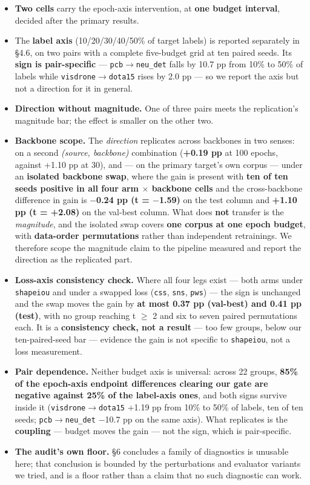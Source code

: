 \documentclass[pdflatex,sn-mathphys-ay]{sn-jnl}
\begin{document}
\begin{itemize}
\item \textbf{Two cells} carry the epoch-axis intervention, at \textbf{one budget interval}, decided after the primary results.
\item The \textbf{label axis} (10/20/30/40/50\% of target labels) is reported separately in \S{}4.6, on two pairs with a complete five-budget grid at ten paired seeds. Its \textbf{sign is pair-specific} --- \texttt{pcb\ensuremath{\rightarrow}neu\_det} falls by 10.7 pp from 10\% to 50\% of labels while \texttt{visdrone\ensuremath{\rightarrow}dota15} rises by 2.0 pp --- so we report the axis but not a direction for it in general.
\item \textbf{Direction without magnitude.} One of three pairs meets the replication's magnitude bar; the effect is smaller on the other two.
\item \textbf{Backbone scope.} The \emph{direction} replicates across backbones in two senses: on a second \emph{(source, backbone)} combination (\textbf{+0.19 pp} at 100 epochs, against +1.10 pp at 30), and --- on the primary target's own corpus --- under an \textbf{isolated backbone swap}, where the gain is present with \textbf{ten of ten seeds positive in all four arm \ensuremath{\times} backbone cells} and the cross-backbone difference in gain is \textbf{\ensuremath{-}0.24 pp (t = \ensuremath{-}1.59)} on the test column and \textbf{+1.10 pp (t = +2.08)} on the val-best column. What does \textbf{not} transfer is the \emph{magnitude}, and the isolated swap covers \textbf{one corpus at one epoch budget}, with \textbf{data-order permutations} rather than independent retrainings. We therefore scope the magnitude claim to the pipeline measured and report the direction as the replicated part.
\item \textbf{Loss-axis consistency check.} Where all four legs exist --- both arms under \texttt{shapeiou} and under a swapped loss (\texttt{css}, \texttt{sns}, \texttt{pws}) --- the sign is unchanged and the swap moves the gain by \textbf{at most 0.37 pp (val-best) and 0.41 pp (test)}, with no group reaching \textbar{}t\textbar{} \ensuremath{\geq} 2 and six to seven paired permutations each. It is a \textbf{consistency check, not a result} --- too few groups, below our ten-paired-seed bar --- evidence the gain is not specific to \texttt{shapeiou}, not a loss measurement.
\item \textbf{Pair dependence.} Neither budget axis is universal: across 22 groups, \textbf{85\% of the epoch-axis endpoint differences clearing our gate are negative against 25\% of the label-axis ones}, and both signs survive inside it (\texttt{visdrone\ensuremath{\rightarrow}dota15} +1.19 pp from 10\% to 50\% of labels, ten of ten seeds; \texttt{pcb\ensuremath{\rightarrow}neu\_det} \ensuremath{-}10.7 pp on the same axis). What replicates is the \textbf{coupling} --- budget moves the gain --- not the sign, which is pair-specific.
\item \textbf{The audit's own floor.} \S{}6 concludes a family of diagnostics is unusable here; that conclusion is bounded by the perturbations and evaluator variants we tried, and is a floor rather than a claim that no such diagnostic can work.
\end{itemize}
\end{document}
